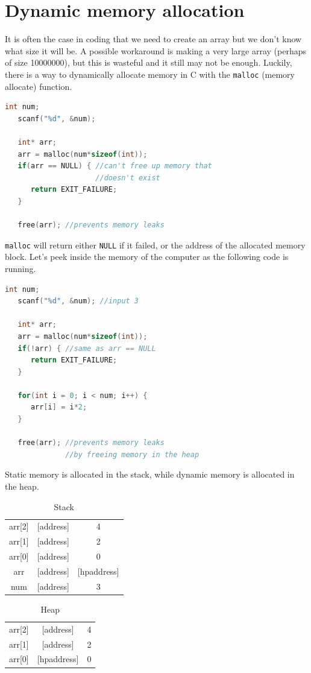 \documentclass[nobib]{tufte-handout}
\begin{document}
\section{Dynamic memory allocation}
It is often the case in coding that we need 
to create an array but we don't know what size it will be. 
A possible workaround is making a very large array (perhaps
of size 10000000), but this is wasteful and it still may not be enough. 
Luckily, there is a way to dynamically allocate memory in C with the 
\texttt{malloc} (memory allocate) function. 
\begin{lstlisting}[language=C,caption=malloc]
   int num;
   scanf("%d", &num);

   int* arr;
   arr = malloc(num*sizeof(int));
   if(arr == NULL) { //can't free up memory that 
                     //doesn't exist
      return EXIT_FAILURE;
   }

   free(arr); //prevents memory leaks
\end{lstlisting}
\texttt{malloc} will return either \texttt{NULL} if it failed, 
or the address of the allocated memory block. Let's peek 
inside the memory of the computer as the following code is 
running. 
\begin{lstlisting}[language=C,caption=malloc example]
   int num;
   scanf("%d", &num); //input 3

   int* arr;
   arr = malloc(num*sizeof(int));
   if(!arr) { //same as arr == NULL
      return EXIT_FAILURE;
   }

   for(int i = 0; i < num; i++) {
      arr[i] = i*2;
   }

   free(arr); //prevents memory leaks
              //by freeing memory in the heap
\end{lstlisting}
Static memory is allocated in the stack, while
dynamic memory is allocated in the heap. 
\begin{table}[h]
   \centering
   \caption{Stack}
   \label{table:stackmalloc}
   \begin{tabular}{|c | c | c|}
   \hline
   arr[2] & [address] & 4 \\
   arr[1] & [address] & 2\\
   arr[0] & [address] & 0\\
   arr & [address] & [hpaddress]\\
   num & [address] & 3 \\
   \hline
   \end{tabular}
\end{table}
\begin{table}[h]
   \centering
   \caption{Heap}
   \label{table:heapmalloc}
   \begin{tabular}{|c|c|c|}
   \hline
   arr[2] & [address] & 4 \\
   arr[1] & [address] & 2\\
   arr[0] & [hpaddress] & 0\\
   \hline
   \end{tabular}
\end{table}
\end{document}
